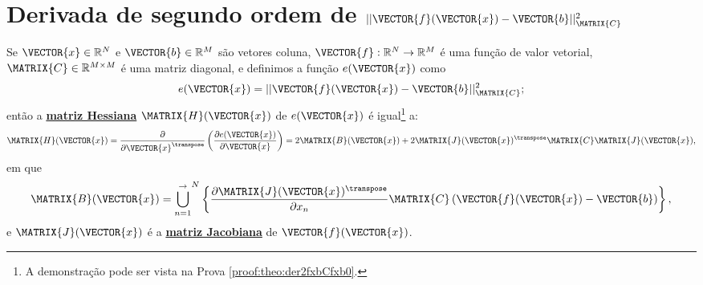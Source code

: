 
\section{Derivada de segundo ordem de $||\VECTOR{f}(\VECTOR{x})-\VECTOR{b}||_{\MATRIX{C}}^2$ 
}



\begin{theorem}\label{theo:der2fxbCfxb0}
Se
$\VECTOR{x}\in \mathbb{R}^N$ e 
$\VECTOR{b}\in \mathbb{R}^M$ são vetores coluna,  
$\VECTOR{f}: \mathbb{R}^{N}\rightarrow \mathbb{R}^{M}$ é uma função de valor vetorial,
$\MATRIX{C} \in \mathbb{R}^{M\times M}$ é uma matriz diagonal, e
definimos a função $e(\VECTOR{x})$ como
\begin{equation}
e(\VECTOR{x})= ||\VECTOR{f}(\VECTOR{x})-\VECTOR{b}||_{\MATRIX{C}}^2;
\end{equation}
então a \hyperref[def:hessian]{\textbf{matriz Hessiana}} $\MATRIX{H}(\VECTOR{x})$ 
de $e(\VECTOR{x})$ é igual\footnote{A demonstração pode ser vista na Prova \ref{proof:theo:der2fxbCfxb0}.} a:
\begin{equation}
\MATRIX{H}(\VECTOR{x}) = \frac{\partial}{\partial \VECTOR{x}^{\transpose}}\left(  
\frac{\partial e(\VECTOR{x}) }{\partial \VECTOR{x}} \right) = 2 \MATRIX{B}(\VECTOR{x})
+2 \MATRIX{J}(\VECTOR{x})^{\transpose}\MATRIX{C} \MATRIX{J}(\VECTOR{x}),
\end{equation}
em que 
\begin{equation}
 \MATRIX{B}(\VECTOR{x})=
{\bigcup\limits_{n=1}^{ \rightarrow }}^{N}\left\{ \frac{\partial \MATRIX{J}(\VECTOR{x})^{\transpose} }{\partial x_{n}} \MATRIX{C} \left( \VECTOR{f}(\VECTOR{x})-\VECTOR{b}\right) \right\},
\end{equation}
e $\MATRIX{J}(\VECTOR{x})$ é a \hyperref[def:jacobian]{\textbf{matriz Jacobiana}} de $\VECTOR{f}(\VECTOR{x})$.
\end{theorem}

